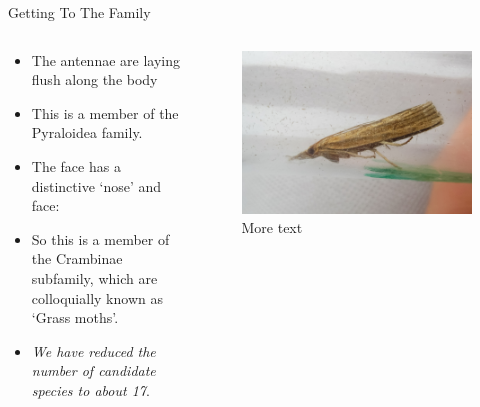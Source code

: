 \documentclass[
  ignorenonframetext,
]{beamer}
\providecommand{\tightlist}{%
  \setlength{\itemsep}{0pt}\setlength{\parskip}{0pt}}
\begin{document}
\begin{frame}{Getting To The Family}
\protect\hypertarget{getting-to-the-family}{}
\begin{columns}[T]
\begin{column}{0.5\textwidth}
\begin{itemize}
\tightlist
\item
  The antennae are laying flush along the body
\item
  This is a member of the Pyraloidea family.
\item
  The face has a distinctive `nose' and face:
\item
  So this is a member of the Crambinae subfamily, which are colloquially
  known as `Grass moths'.
\item
  \emph{We have reduced the number of candidate species to about 17}.
\end{itemize}
\end{column}

\begin{column}{0.5\textwidth}
\begin{figure}
\centering
\includegraphics{./images/Pcontaminella-PML-2021.jpg}
\caption{More text}
\end{figure}
\end{column}
\end{columns}
\end{frame}
\end{document}

